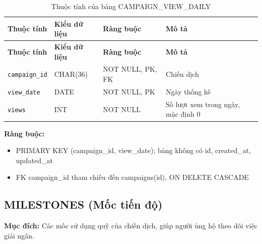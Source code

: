 {\small
\begin{longtable}{|P{3.2cm}|P{2.8cm}|P{2.2cm}|p{5.4cm}|}
    \caption{Thuộc tính của bảng CAMPAIGN\_\allowbreak{}VIEW\_\allowbreak{}DAILY}
    \label{tab:campaign_view_daily} \\
    \hline
    \textbf{Thuộc tính} & \textbf{Kiểu dữ liệu} & \textbf{Ràng buộc} & \textbf{Mô tả} \\
    \hline
    \endfirsthead
    \hline
    \textbf{Thuộc tính} & \textbf{Kiểu dữ liệu} & \textbf{Ràng buộc} & \textbf{Mô tả} \\
    \hline
    \endhead

    \texttt{campaign\_\allowbreak{}id} & CHAR(36) & NOT NULL, PK, FK & Chiến dịch \\
    \hline
    \texttt{view\_\allowbreak{}date} & DATE & NOT NULL, PK & Ngày thống kê \\
    \hline
    \texttt{views} & INT & NOT NULL & Số lượt xem trong ngày, mặc định 0 \\
    \hline
\end{longtable}
}

\textbf{Ràng buộc:}
\begin{itemize}
    \item PRIMARY KEY (campaign\_\allowbreak{}id, view\_\allowbreak{}date); bảng không có id, created\_\allowbreak{}at, updated\_\allowbreak{}at
    \item FK campaign\_\allowbreak{}id tham chiếu đến campaigns(id), ON DELETE CASCADE
\end{itemize}

\subsection{MILESTONES (Mốc tiến độ)}

\textbf{Mục đích:} Các mốc sử dụng quỹ của chiến dịch, giúp người ủng hộ theo dõi việc giải ngân.

